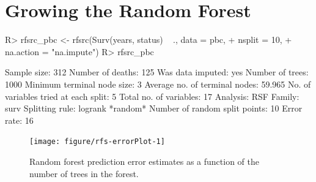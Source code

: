 \documentclass[nojss]{jss}
\begin{document}
\section{Growing the Random Forest}

\begin{Schunk}
\begin{Sinput}
R> rfsrc_pbc <- rfsrc(Surv(years, status) ~ ., data = pbc, 
+                    nsplit = 10, 
+                    na.action = "na.impute")
R> rfsrc_pbc
\end{Sinput}
\end{Schunk}

\begin{Schunk}
\begin{Soutput}
                         Sample size: 312
                    Number of deaths: 125
                    Was data imputed: yes
                     Number of trees: 1000
          Minimum terminal node size: 3
       Average no. of terminal nodes: 59.965
No. of variables tried at each split: 5
              Total no. of variables: 17
                            Analysis: RSF
                              Family: surv
                      Splitting rule: logrank *random*
       Number of random split points: 10
                          Error rate: 16%
\end{Soutput}
\end{Schunk}

\begin{Schunk}
\begin{figure}[!htpb]

{\centering \texttt{[image: figure/rfs-errorPlot-1]} 

}

\caption[Random forest prediction error estimates as a function of the number of trees in the forest]{Random forest prediction error estimates as a function of the number of trees in the forest.\label{fig:errorPlot}}
\end{figure}
\end{Schunk}
\end{document}
